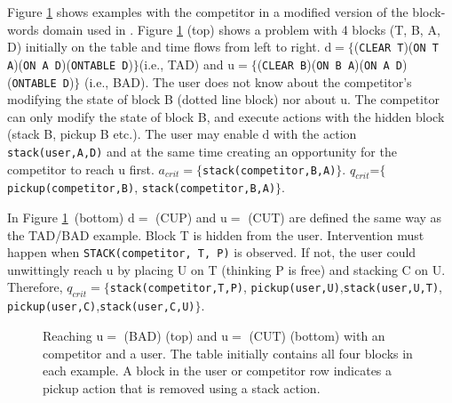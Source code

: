 \documentclass[letterpaper]{article}
\theoremstyle{plain}
\begin{document}
Figure \ref{fig:multi} shows examples with the competitor in a modified version of the block-words domain used in \cite{ramirez2009plan}.
Figure \ref{fig:multi} (top) shows a problem with 4 blocks (T, B, A, D) initially on the table and time flows from left to right. 
$\mathrm{d}=\lbrace$(\texttt{CLEAR T})(\texttt{ON T A})(\texttt{ON A D})(\texttt{ONTABLE D})$\rbrace$(i.e., TAD) and $\mathrm{u}=\lbrace$(\texttt{CLEAR B})(\texttt{ON B A})(\texttt{ON A D})(\texttt{ONTABLE D})$\rbrace$ (i.e., BAD).
The user does not know about the competitor's modifying the state of block B (dotted line block) nor about $\mathrm{u}$. The competitor can only modify the state of block B, and execute actions with the hidden block (stack B, pickup B etc.).
The user may enable $\mathrm{d}$ with the action \texttt{stack(user,A,D)} and at the same time creating an opportunity for the competitor to reach $\mathrm{u}$ first. 
$a_{crit}=\lbrace$\texttt{stack(competitor,B,A)}$\rbrace$. 
$q_{crit}$=$\lbrace$\texttt{pickup(competitor,B)}, \texttt{stack(competitor,B,A)}$\rbrace$.

In Figure \ref{fig:multi}~(bottom) $\mathrm{d}= $ (CUP) and $\mathrm{u}= $ (CUT) are defined the same way as the TAD/BAD example. Block T is hidden from the user. Intervention must happen when \texttt{STACK(competitor, T, P)} is observed. If not, the user could unwittingly reach $\mathrm{u}$ by placing U on T (thinking P is free) and stacking C on U. 
Therefore, $q_{crit}=\lbrace$\texttt{stack(competitor,T,P)}, \texttt{pickup(user,U)},\texttt{stack(user,U,T)}, \texttt{pickup(user,C)},\texttt{stack(user,C,U)}$\rbrace$.

\begin{figure}[t]
                  \vspace{-1em}
        \caption{Reaching $\mathrm{u}= $ (BAD) (top) and $\mathrm{u}= $ (CUT) (bottom) with an competitor and a user.  The table initially contains all four blocks in each example. A block in the user or competitor row indicates a pickup action that is removed using a stack action.}
        \vspace{-1em}
        \label{fig:multi}
\end{figure}
\end{document}
